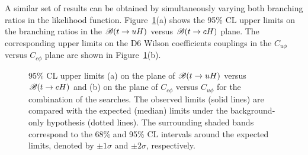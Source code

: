A similar set of results can be obtained by simultaneously varying both branching ratios in the likelihood function.
Figure~\ref{fig:limits_combo_2D}(a) shows the 95\% CL upper limits on the branching ratios in the $\mathscr{B}(t\to uH)$ versus $\mathscr{B}(t\to cH)$ plane. 
The corresponding upper limits on the D6 Wilson coefficients couplings in the $C_{u\phi}$ versus $C_{c\phi}$ plane are shown in Figure~\ref{fig:limits_combo_2D}(b).

\begin{figure}[t!]
\begin{center}
\caption{\small {95\% CL upper limits (a) on the plane of $\mathscr{B}(t\to uH)$ versus $\mathscr{B}(t\to cH)$ and (b) on the plane 
of $C_{c\phi}$ versus $C_{u\phi}$ for the combination of the searches. The observed limits (solid lines) are compared with the expected (median) limits under the background-only hypothesis (dotted lines). The surrounding shaded bands correspond to the 68\% and 95\% CL intervals around the expected limits, 
denoted by $\pm 1\sigma$ and $\pm 2\sigma$, respectively.}}
\label{fig:limits_combo_2D} 
\end{center}
\end{figure}


